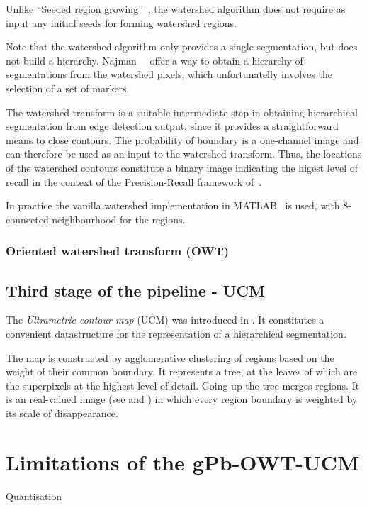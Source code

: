 Unlike ``Seeded region growing''~\cite{adams1994seeded}, the watershed algorithm does not require as input any initial seeds for forming watershed regions.

Note that the watershed algorithm only provides a single segmentation, but does not build a hierarchy. %
Najman~\etal~\cite{najman1996geodesic} offer a way to obtain a hierarchy of segmentations from the watershed pixels, which unfortunatelly involves the selection of a set of markers.

The watershed transform is a suitable intermediate step in obtaining hierarchical segmentation from edge detection output, since it provides a straightforward means to close contours. The probability of boundary is a one-channel image and can therefore be used as an input to the watershed transform. Thus, the locations of the watershed contours constitute a binary image indicating the higest level of recall in the context of the Precision-Recall framework of~\cite{Arbelaez11}. %

In practice the vanilla watershed implementation in MATLAB~\cite{MATLABwatershed} is used, with 8-connected neighbourhood for the regions.

\subsubsection{Oriented watershed transform (OWT)}
\label{sec:ch3-OWT}

\subsection{Third stage of the pipeline - UCM}
\label{sec:ch3-UCM}
The {\it Ultrametric contour map} (UCM) was introduced in \cite{Arbelaez2006boundary}. It constitutes a convenient datastructure for the representation of a hierarchical segmentation. 

The map is constructed by agglomerative clustering of regions based on the weight of their common boundary. It represents a tree, at the leaves of which are the superpixels at the highest level of detail. Going up the tree merges regions. It is an real-valued image (see  and ) in which every region boundary is weighted by its scale of disappearance.



\section{Limitations of the gPb-OWT-UCM} %
Quantisation